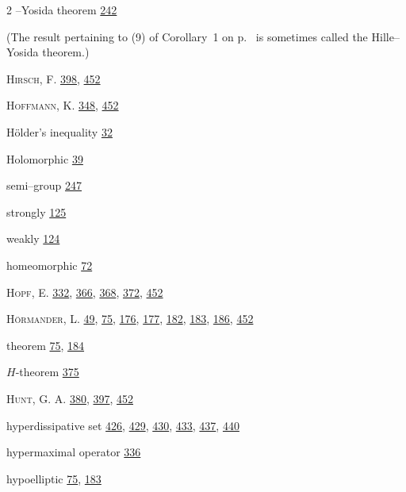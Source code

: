 \begin{multicols}{2}
\hspace*{1.1em}--Yosida theorem \hyperlink{page.242}{242}\par
\hspace*{1.1em}\parbox[t]{\dimexpr\linewidth-1.1em\relax}{(The result pertaining to (9) of Corollary~1 on p.~\pageref{cor:IX.7.Corollary.1} is sometimes called the Hille--Yosida theorem.)}\par
\noindent \textsc{Hirsch}, F. \hyperlink{page.398}{398}, \hyperlink{page.452}{452}\par
\noindent \textsc{Hoffmann}, K. \hyperlink{page.348}{348}, \hyperlink{page.452}{452}\par
\noindent Hölder's inequality \hyperlink{page.32}{32}\par
\noindent Holomorphic \hyperlink{page.39}{39}\par
\hspace*{1.1em}semi--group \hyperlink{page.247}{247}\par
\hspace*{1.1em}strongly \hyperlink{page.125}{125}\par
\hspace*{1.1em}weakly \hyperlink{page.124}{124}\par
\noindent homeomorphic \hyperlink{page.72}{72}\par
\noindent \textsc{Hopf}, E. \hyperlink{page.332}{332}, \hyperlink{page.366}{366}, \hyperlink{page.368}{368}, \hyperlink{page.372}{372}, \hyperlink{page.452}{452}\par
\noindent \textsc{Hörmander}, L. \hyperlink{page.49}{49}, \hyperlink{page.75}{75}, \hyperlink{page.176}{176}, \hyperlink{page.177}{177}, \hyperlink{page.182}{182}, \hyperlink{page.183}{183}, \hyperlink{page.186}{186}, \hyperlink{page.452}{452}\par
\hspace*{1.1em}theorem \hyperlink{page.75}{75}, \hyperlink{page.184}{184}\par
\noindent $H$-theorem \hyperlink{page.375}{375}\par
\noindent \textsc{Hunt}, G. A. \hyperlink{page.380}{380}, \hyperlink{page.397}{397}, \hyperlink{page.452}{452}\par
\noindent hyperdissipative set \hyperlink{page.426}{426}, \hyperlink{page.429}{429}, \hyperlink{page.430}{430}, \hyperlink{page.433}{433}, \hyperlink{page.437}{437}, \hyperlink{page.440}{440}\par
\noindent hypermaximal operator \hyperlink{page.336}{336}\par
\noindent hypoelliptic \hyperlink{page.75}{75}, \hyperlink{page.183}{183}\par

\end{multicols}
